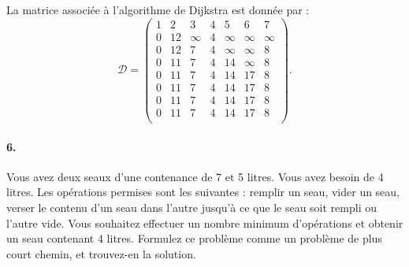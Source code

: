 \begin{center}
\end{center}

\begin{solution}
  La matrice associée à l'algorithme de Dijkstra est donnée par :
  \[
    \mathcal{D}=
    \begin{pmatrix}
      1 & 2   & 3       & 4  & 5          & 6 & 7 \\
      \boxed{0} & 12 & \infty & 4 & \infty    &\infty & \infty  \\
      \boxed{0} & 12 & 7       & \boxed{4} & \infty    & \infty  & 8  \\
      \boxed{0} & 11 & \boxed{7}       &\boxed{4} & 14         & \infty  & 8\\
      \boxed{0} & 11 & \boxed{7}       & \boxed{4}& 14         & 17 & \boxed{8}\\
      \boxed{0} & \boxed{11} & \boxed{7}       & \boxed{4} & 14         & 17 &  \boxed{8}\\
      \boxed{0} & \boxed{11} & \boxed{7}      & \boxed{4} & \boxed{14}         & 17 &  \boxed{8}\\
      \boxed{0} & \boxed{11}& \boxed{7}       & \boxed{4} & \boxed{14}         & \boxed{17} &  \boxed{8}\\
    \end{pmatrix}.
  \]
\end{solution}

\paragraph{6. } Vous avez deux seaux d'une contenance de 7 et 5 litres. Vous avez besoin de 4 litres. Les opérations permises sont les suivantes : remplir un seau, vider un seau, verser le contenu d'un seau dans l'autre jusqu'à ce que le seau soit rempli ou l'autre vide. Vous souhaitez effectuer un nombre minimum d'opérations et obtenir un seau contenant 4 litres. Formulez ce problème comme un problème de plus court chemin, et trouvez-en la solution.

